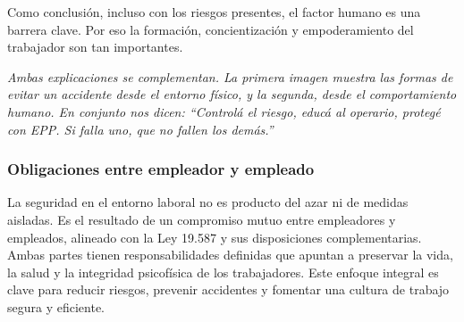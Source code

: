 \documentclass[a4paper,oneside,11pt]{article}
\begin{document}
Como conclusión, incluso con los riesgos presentes, el factor humano es una barrera clave. Por eso la formación, concientización y empoderamiento del trabajador son tan importantes.

\textit{Ambas explicaciones se complementan. La primera imagen muestra las formas de evitar un accidente desde el entorno físico, y la segunda, desde el comportamiento humano. En conjunto nos dicen: “Controlá el riesgo, educá al operario, protegé con EPP. Si falla uno, que no fallen los demás.”}

\subsubsection{Obligaciones entre empleador y empleado}

La seguridad en el entorno laboral no es producto del azar ni de medidas aisladas. Es el resultado de un compromiso mutuo entre empleadores y empleados, alineado con la Ley 19.587 y sus disposiciones complementarias. Ambas partes tienen responsabilidades definidas que apuntan a preservar la vida, la salud y la integridad psicofísica de los trabajadores. Este enfoque integral es clave para reducir riesgos, prevenir accidentes y fomentar una cultura de trabajo segura y eficiente.
\end{document}
